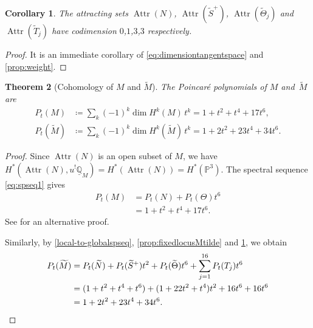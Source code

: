 \documentclass[JEP,XML,SOM,Unicode, NoEqCountersInSection,NoFloatCountersInSection,published]{cedram}
\newtheorem{thm}{Theorem}[section]
\newtheorem{cor}[thm]{Corollary}
\theoremstyle{definition}
\newcommand{\PP}{\mathbb{P}}
\newcommand{\QQ}{\mathbb{Q}}
\newcommand{\Attr}{\operatorname{Attr}}
\let\NBun N
\begin{document}
\begin{cor}\label{cor:codimattr}
The attracting sets $\Attr(\NBun)$, $\Attr(\widetilde{S}^+)$, $\Attr(\widetilde{\Theta}_j)$ and $\Attr(\widetilde{T}_j)$ have codimension $0$,$1$,$3$,$3$ respectively.
\end{cor}
\begin{proof}
It is an immediate corollary of \eqref{eq:dimensiontangentspace} and \cref{prop:weight}.
\end{proof}


\begin{thm}[Cohomology of $M$ and $\widetilde{M}$]\label{thm:PoincarePoly}
The Poincaré polynomials of $M$ and~$\widetilde{M}$ are
\begin{align}\label{eq:Poincarepolynomial}
P_t(M)&\coloneqq \sum_k (-1)^k\dim H^k(M)\,t^k=1+t^2+t^4+17 t^6,
\\
\label{eq:Poincarepolynomialres}
P_t(\widetilde{M})&\coloneqq \sum_k (-1)^k\dim H^k(\widetilde{M})\,t^k = 1+2t^2+23t^4+34t^6.
\end{align}
\end{thm}
\begin{proof}
Since $\Attr(\NBun)$ is an open subset of $M$, we have $H^*(\Attr(\NBun), u^{!}\underline{\QQ}_{M}) = H^*(\Attr(\NBun))=H^*(\PP^3)$. The spectral sequence \eqref{eq:spseq1} gives
\begin{align*}
P_t(M)& =P_t(\NBun) + P_t(\Theta)t^6\\
&= 1+t^2+t^4+17 t^6.
\end{align*}
See \cite[Th.\,1.5]{DaskalopoulosWentworth10} for an alternative proof.

Similarly, by \cref{local-to-globalspseq}, \cref{prop:fixedlocusMtilde} and \cref{cor:codimattr}, we obtain
\begin{align*}
P_t(\widetilde{M})& =P_t(\widetilde{\NBun}) + P_t(\widetilde{S}^+)t^2 + P_t(\widetilde{\Theta})t^6 + \sum^{16}_{j=1}P_t(T_j)t^6\\
& = (1+t^2+t^4+t^6)+(1+22 t^2 +t^4)t^2 + 16t^6 + 16t^6\\
& =1+2t^2+23t^4+34t^6.\qedhere
\end{align*}
\end{proof}

\label{sec:moduliMiota}
\end{document}
